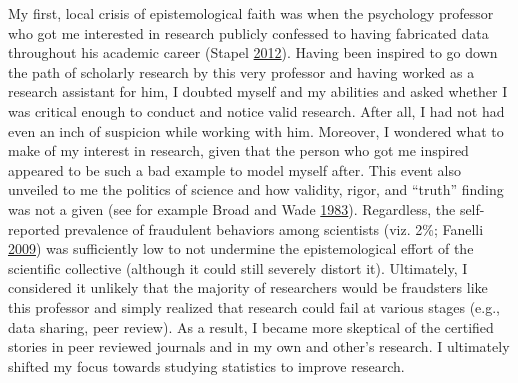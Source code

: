 \documentclass[a5paper]{book}
\begin{document}
My first, local crisis of epistemological faith was when the psychology
professor who got me interested in research publicly confessed to having
fabricated data throughout his academic career (Stapel
\protect\hyperlink{ref-isbn:9789044623123}{2012}). Having been inspired
to go down the path of scholarly research by this very professor and
having worked as a research assistant for him, I doubted myself and my
abilities and asked whether I was critical enough to conduct and notice
valid research. After all, I had not had even an inch of suspicion while
working with him. Moreover, I wondered what to make of my interest in
research, given that the person who got me inspired appeared to be such
a bad example to model myself after. This event also unveiled to me the
politics of science and how validity, rigor, and \enquote{truth} finding
was not a given (see for example Broad and Wade
\protect\hyperlink{ref-isbn:9780671447694}{1983}). Regardless, the
self-reported prevalence of fraudulent behaviors among scientists (viz.
2\%; Fanelli
\protect\hyperlink{ref-doi:10.1371ux2fjournal.pone.0005738}{2009}) was
sufficiently low to not undermine the epistemological effort of the
scientific collective (although it could still severely distort it).
Ultimately, I considered it unlikely that the majority of researchers
would be fraudsters like this professor and simply realized that
research could fail at various stages (e.g., data sharing, peer review).
As a result, I became more skeptical of the certified stories in peer
reviewed journals and in my own and other's research. I ultimately
shifted my focus towards studying statistics to improve research.
\end{document}
